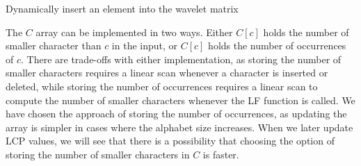 \begin{algorithm}[t]
  \SetAlgoLined\DontPrintSemicolon

  \vspace{0.5cm}
  \caption{Dynamically insert an element into the wavelet matrix}
  \label{alg:waveletmatrixinsert}
\end{algorithm}

The $C$ array can be implemented in two ways. Either $C[c]$ holds the number of smaller
character than $c$ in the input, or $C[c]$ holds the number of occurrences of $c$. There
are trade-offs with either implementation, as storing the number of smaller characters
requires a linear scan whenever a character is inserted or deleted, while storing the number
of occurrences requires a linear scan to compute the number of smaller characters whenever
the LF function is called. We have chosen the approach of storing the number of
occurrences, as updating the array is simpler in cases where the alphabet size increases.
When we later update LCP values, we will see that there is a possibility that choosing the
option of storing the number of smaller characters in $C$ is faster. 

